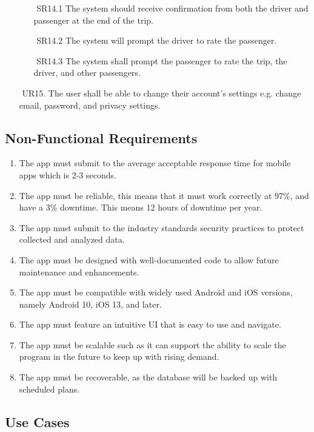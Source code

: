 \documentclass[a4paper, 12pt]{article} %
\begin{document}
\begin{itemize}
                \begin{itemize}
                    \item [$ $] SR14.1 The system should receive confirmation from both the driver and passenger at the end of the trip. 
                    \item [$ $] SR14.2 The system will prompt the driver to rate the passenger. 
                    \item [$ $] SR14.3 The system shall prompt the passenger to rate the trip, the driver, and other passengers. 
                \end{itemize}
                \item [$ $] UR15. The user shall be able to change their account’s settings e.g. change email, password, and privacy settings.  
           \end{itemize}
        \subsection{Non-Functional Requirements}
        \begin{enumerate}
            \item The app must submit to the average acceptable response time for mobile apps which is 2-3 seconds.
            \item The app must be reliable, this means that it must work correctly at 97\%, and have a 3\% downtime. This means 12 hours of downtime per year.
            \item The app must submit to the industry standards security practices to protect collected and analyzed data.
            \item The app must be designed with well-documented code to allow future maintenance and enhancements.
            \item The app must be compatible with widely used Android and iOS versions, namely Android 10, iOS 13, and later.
            \item The app must feature an intuitive UI that is easy to use and navigate.
            \item The app must be scalable such as it can support the ability to scale the program in the future to keep up with rising demand.
            \item The app must be recoverable, as the database will be backed up with scheduled plans.
        \end{enumerate}
    \subsection{Use Cases}
\end{document}
